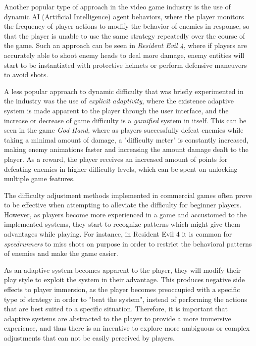 Another popular type of approach in the video game industry is the use of dynamic AI (Artificial Intelligence) agent behaviors, where the player monitors the frequency of player actions to modify the behavior of enemies in response, so that the player is unable to use the same strategy repeatedly over the course of the game. Such an approach can be seen in \emph{Resident Evil 4}, where if players are accurately able to shoot enemy heads to deal more damage, enemy entities will start to be instantiated with protective helmets or perform defensive maneuvers to avoid shots.

A less popular approach to dynamic difficulty that was briefly experimented in the industry was the use of \emph{explicit adaptivity}, where the existence adaptive system is made apparent to the player through the user interface, and the increase or decrease of game difficulty is a \emph{gamified} system in itself. This can be seen in the game \emph{God Hand}, where as players successfully defeat enemies while taking a minimal amount of damage, a "difficulty meter" is constantly increased, making enemy animations faster and increasing the amount damage dealt to the player. As a reward, the player receives an increased amount of points for defeating enemies in higher difficulty levels, which can be spent on unlocking multiple game features. 


The difficulty adjustment methods implemented in commercial games often prove to be effective when attempting to alleviate the difficulty for beginner players. However, as players become more experienced in a game and accustomed to the implemented systems, they start to recognize patterns which might give them advantages while playing. For instance, in Resident Evil 4 it is common for \emph{speedrunners} to miss shots on purpose in order to restrict the behavioral patterns of enemies and make the game easier.

As an adaptive system becomes apparent to the player, they will modify their play style to exploit the system in their advantage. This produces negative side effects to player immersion, as the player becomes preoccupied with a specific type of strategy in order to "beat the system", instead of performing the actions that are best suited to a specific situation. Therefore, it is important that adaptive systems are abstracted to the player to provide a more immersive experience, and thus there is an incentive to explore more ambiguous or complex adjustments that can not be easily perceived by players.

